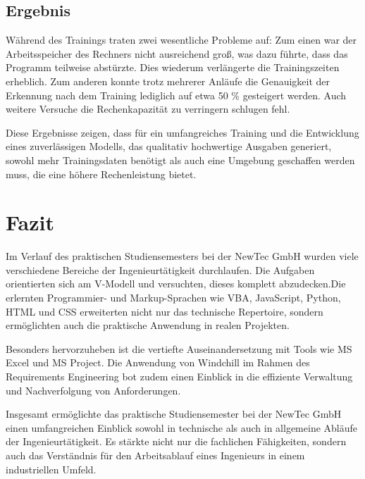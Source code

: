 \documentclass[11pt,a4paper]{report}
\begin{document}
\section{Ergebnis}


Während des Trainings traten zwei wesentliche Probleme auf: Zum einen war der Arbeitsspeicher des Rechners nicht ausreichend groß, was dazu führte, dass das Programm teilweise abstürzte. Dies wiederum verlängerte die Trainingszeiten erheblich. Zum anderen konnte trotz mehrerer Anläufe die Genauigkeit der Erkennung nach dem Training lediglich auf etwa 50 \% gesteigert werden. Auch weitere Versuche die Rechenkapazität zu verringern schlugen fehl.

Diese Ergebnisse zeigen, dass für ein umfangreiches Training und die Entwicklung eines zuverlässigen Modells, das qualitativ hochwertige Ausgaben generiert, sowohl mehr Trainingsdaten benötigt als auch eine Umgebung geschaffen werden muss, die eine höhere Rechenleistung bietet.


\chapter{Fazit} \label{chap:fazit}

Im Verlauf des praktischen Studiensemesters bei der NewTec GmbH wurden viele verschiedene Bereiche der Ingenieurtätigkeit durchlaufen. Die Aufgaben orientierten sich am V-Modell und versuchten, dieses komplett abzudecken.Die erlernten Programmier- und Markup-Sprachen wie VBA, JavaScript, Python, HTML und CSS erweiterten nicht nur das technische Repertoire, sondern ermöglichten auch die praktische Anwendung in realen Projekten.

Besonders hervorzuheben ist die vertiefte Auseinandersetzung mit Tools wie MS Excel und MS Project. Die Anwendung von Windchill im Rahmen des Requirements Engineering bot zudem einen Einblick in die effiziente Verwaltung und Nachverfolgung von Anforderungen.

Insgesamt ermöglichte das praktische Studiensemester bei der NewTec GmbH einen umfangreichen Einblick sowohl in technische als auch in allgemeine Abläufe der Ingenieurtätigkeit. Es stärkte nicht nur die fachlichen Fähigkeiten, sondern auch das Verständnis für den Arbeitsablauf eines Ingenieurs in einem industriellen Umfeld.


\newpage

\end{document}

